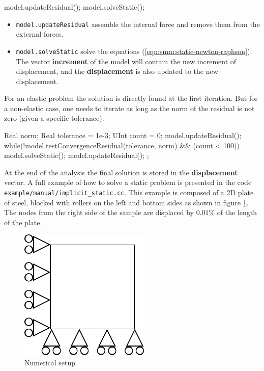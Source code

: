 \documentclass[a4paper,11pt]{book}
\newcommand{\code}[1]{\texttt{#1}}
\begin{document}
\begin{cpp}
  model.updateResidual();
  model.solveStatic();
\end{cpp}
\begin{itemize}
\item \code{model.updateResidual}  assemble the  internal force and  remove them
  from the external forces.
\item         \code{model.solveStatic}        solve         the        equations
  (\ref{eqn:smm:static-newton-raphson}).   The vector \textbf{increment}  of the
  model   will   contain   the   new   increment  of   displacement,   and   the
  \textbf{displacement} is also updated to the new displacement.
\end{itemize}

For  an   elastic  problem  the  solution   is  directly  found   at  the  first
iteration. But for a non-elastic case, one  needs to iterate as long as the norm
of the residual is not zero (given a specific tolerance).
\begin{cpp}
  Real norm;
  Real tolerance = 1e-3;
  UInt count = 0;
  model.updateResidual();
  while(!model.testConvergenceResidual(tolerance, norm) && (count < 100)) {
    model.solveStatic();
    model.updateResidual();
  };
\end{cpp}

At   the  end   of  the   analysis  the   final  solution   is  stored   in  the
\textbf{displacement} vector.  A  full example of how to  solve a static problem
is  presented  in   the  code  \code{example/manual/implicit\_static.cc}.   This
example is composed of a 2D plate of steel, blocked with rollers on the left and
bottom sides as shown in  figure \ref{fig:smm:static}.  The nodes from the right
side of the sample are displaced by $0.01\%$ of the length of the plate.

\begin{figure}[!htb]
  \centering
  \includegraphics{figures/implicit_static}
  \caption{Numerical setup\label{fig:smm:static}}
\end{figure}
\end{document}
